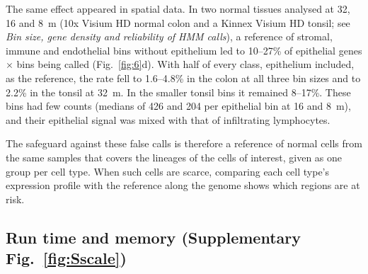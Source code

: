 The same effect appeared in spatial data. In two normal tissues analysed at 32, 16 and 8~\textmu m (10x Visium HD normal colon and a Kinnex Visium HD tonsil; see \emph{Bin size, gene density and reliability of HMM calls}), a reference of stromal, immune and endothelial bins without epithelium led to 10--27\% of epithelial genes $\times$ bins being called (Fig.~\ref{fig:6}d). With half of every class, epithelium included, as the reference, the rate fell to 1.6--4.8\% in the colon at all three bin sizes and to 2.2\% in the tonsil at 32~\textmu m. In the smaller tonsil bins it remained 8--17\%. These bins had few counts (medians of 426 and 204 per epithelial bin at 16 and 8~\textmu m), and their epithelial signal was mixed with that of infiltrating lymphocytes.

The safeguard against these false calls is therefore a reference of normal cells from the same samples that covers the lineages of the cells of interest, given as one group per cell type. When such cells are scarce, comparing each cell type's expression profile with the reference along the genome shows which regions are at risk.


\subsection{Run time and memory (Supplementary Fig.~\ref{fig:Sscale})}


